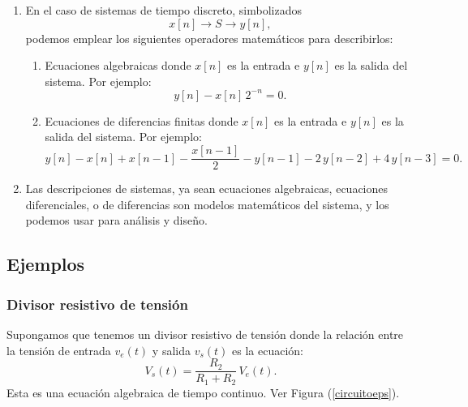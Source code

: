\begin{enumerate}
\begin{enumerate}
		\item Ecuaciones diferenciales donde $x(t)$ es la entrada e $y(t)$ es la salida del sistema. Por ejemplo:
		\begin{equation}
			\frac{d y(t)}{dt} + 2 \, y(t) - x(t) = 0.
		\end{equation}
	\end{enumerate}
	
	\item En el caso de sistemas de tiempo discreto, simbolizados
	\begin{equation}
		x[n] \rightarrow S \rightarrow y[n],
	\end{equation}
	podemos emplear los siguientes operadores matemáticos para describirlos:
	\begin{enumerate}
		\item Ecuaciones algebraicas donde $x[n]$ es la entrada e $y[n]$ es la salida del sistema. Por ejemplo:
		\begin{equation}
			y[n] - x[n] \, 2^{-n} = 0.
		\end{equation}
		
		\item Ecuaciones de diferencias finitas donde $x[n]$ es la entrada e $y[n]$ es la salida del sistema. Por ejemplo:
		\begin{equation}
			y[n] - x[n] + x[n-1] - \frac{x[n-1]}{2} - y[n-1] - 2 \, y[n-2] + 4 \, y[n-3] = 0.
		\end{equation}
	\end{enumerate}
	
	\item Las descripciones de sistemas, ya sean ecuaciones algebraicas, ecuaciones diferenciales, o de diferencias son modelos matemáticos del sistema, y los podemos usar para análisis y diseño.
\end{enumerate}

\subsection{Ejemplos}

\subsubsection{Divisor resistivo de tensión}
Supongamos que tenemos un divisor resistivo de tensión donde la relación entre la tensión de entrada $v_{e}(t)$ y salida $v_{s}(t)$ es la ecuación:
\begin{equation}
	V_{s}(t) = \frac{R_{2}}{R_{1} + R_{2}} \, V_{e}(t). \label{divires}
\end{equation}
Esta es una ecuación algebraica de tiempo continuo. Ver Figura (\ref{circuitoeps}).

